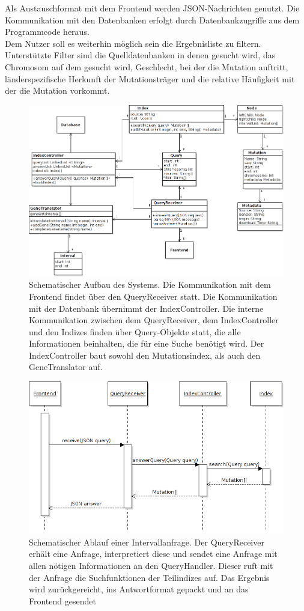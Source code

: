 Als Austauschformat mit dem Frontend werden JSON-Nachrichten genutzt. Die Kommunikation mit den Datenbanken erfolgt durch Datenbankzugriffe aus dem Programmcode heraus.\\
Dem Nutzer soll es weiterhin möglich sein die Ergebnisliste zu filtern. Unterstützte Filter sind die Quelldatenbanken in denen gesucht wird, das Chromosom auf dem gesucht wird, Geschlecht, bei der die Mutation auftritt, länderspezifische Herkunft der Mutationsträger und die relative Häufigkeit mit der die Mutation vorkommt.
\begin{figure}[H]
\includegraphics[width=1\textwidth]{middleware/Middleware_Class_final.png}
\caption{Schematischer Aufbau des Systems. Die Kommunikation mit dem Frontend findet über den QueryReceiver statt. Die Kommunikation mit der Datenbank übernimmt der IndexController. Die interne Kommunikation zwischen dem QueryReceiver, dem IndexController und den Indizes finden über Query-Objekte statt, die alle Informationen beinhalten, die für eine Suche benötigt wird. Der IndexController baut sowohl den Mutationsindex, als auch den GeneTranslator auf.}
\end{figure}
\begin{figure}[H]
\includegraphics[width=1\textwidth]{middleware/intervall_seq.png}
\caption{Schematischer Ablauf einer Intervallanfrage. Der QueryReceiver erhält eine Anfrage, interpretiert diese und sendet eine Anfrage mit allen nötigen Informationen an den QueryHandler. Dieser ruft mit der Anfrage die Suchfunktionen der Teilindizes auf. Das Ergebnis wird zurückgereicht, ins Antwortformat gepackt und an das Frontend gesendet}
\end{figure}
